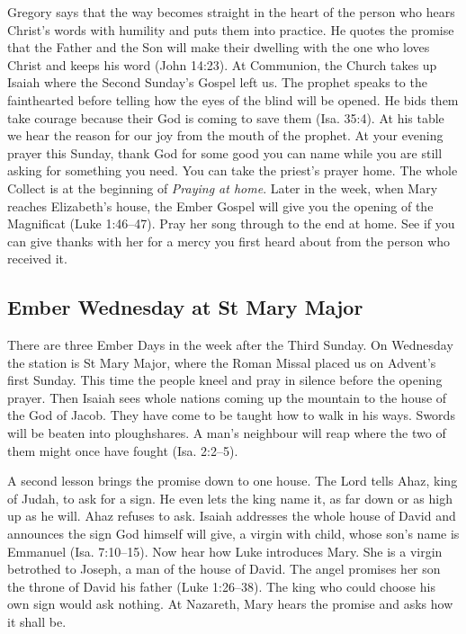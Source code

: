 Gregory says that the way becomes straight in the heart of the person who
hears Christ's words with humility and puts them into practice. He quotes
the promise that the Father and the Son will make their dwelling with the
one who loves Christ and keeps his word (John 14:23). At Communion, the
Church takes up Isaiah where the Second Sunday's Gospel left us. The
prophet speaks to the fainthearted before telling how the eyes of the
blind will be opened. He bids them take courage because their God is
coming to save them (Isa. 35:4). At his table we hear the reason for our
joy from the mouth of the prophet. At your evening prayer this Sunday,
thank God for some good you can name while you are still asking for
something you need. You can take the priest's prayer home. The whole
Collect is at the beginning of \emph{Praying at home}. Later in the
week, when Mary reaches Elizabeth's house, the Ember Gospel will give you the opening of the Magnificat
(Luke 1:46--47). Pray her song through to the end at home. See if you
can give thanks with her for a mercy you first heard about from the
person who received it.

\subsection{Ember Wednesday at St Mary Major}
\label{sec:advent-ember-wednesday}

There are three Ember Days in the week after the Third Sunday. On
Wednesday the station is St Mary Major, where the Roman Missal placed
us on Advent's first Sunday. This time the people kneel and pray in
silence before the opening prayer. Then Isaiah sees whole nations
coming up the mountain to the house of the God of Jacob. They have
come to be taught how to walk in his ways. Swords will be beaten into
ploughshares. A man's neighbour will reap where the two of them might
once have fought (Isa. 2:2--5).

A second lesson brings the promise down to one house. The Lord tells
Ahaz, king of Judah, to ask for a sign. He even lets the king name it,
as far down or as high up as he will. Ahaz refuses to ask. Isaiah
addresses the whole house of David and announces the sign God himself
will give, a virgin with child, whose son's name is Emmanuel
(Isa. 7:10--15). Now hear how Luke introduces Mary. She is a virgin
betrothed to Joseph, a man of the house of David. The angel promises
her son the throne of David his father (Luke 1:26--38). The king
who could choose his own sign would ask nothing. At Nazareth, Mary
hears the promise and asks how it shall be.


